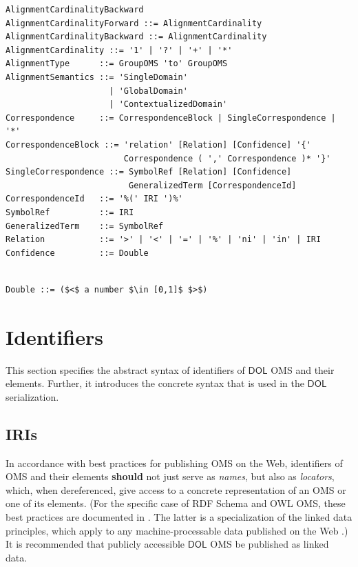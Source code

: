 \documentclass[10pt,fleqn,final]{scrreprt}
\makeatletter
\newcommand*\CommentAuthor{}
\renewcommand*\CommentAuthor{#1}}
\newcommand*\CommentDate{}
\renewcommand*\CommentDate{#1}}
\newcommand*\CommentId{}
\renewcommand*\CommentId{#1}}
\newcommand*\CommentType{}
\renewcommand*\CommentType{#1}}
\newcommand*{\SetCommentColorByType}[1]{%
\edef\localType{{#1}}%
\expandafter\ifstrequal\localType{q-aut}{\colorlet{CommentColor}{red}}{%
\expandafter\ifstrequal\localType{q-all}{\colorlet{CommentColor}{orange}}{%
\expandafter\ifstrequal\localType{todo}{\colorlet{CommentColor}{orange}}{%
\expandafter\ifstrequal\localType{fyi}{\colorlet{CommentColor}{lightgray}}{%
\colorlet{CommentColor}{yellow}}}}}}
\newcommand*{\SetCommentPrefixByType}[1]{%
\edef\localType{{#1}}%
\expandafter\@ifmtarg\localType{%
\edef\CommentPrefix{}%
}{%
\caseupper[q]{#1}%
\edef\CommentPrefix{\thestring: }%
}}
\newcommand*{\initComment}[1]{%
\setkeys{Comment}{#1}%
\SetCommentColorByType{\CommentType}%
\relax%
\SetCommentPrefixByType{\CommentType}%
\relax%
}
\newcommand*{\todonote}[2][]{%
\initComment{#1}%
\pdfcomment[author=\CommentAuthor,color=CommentColor,date=\CommentDate,id=\CommentId]{%
\CommentPrefix
#2}}
\renewcommand*{\todonote}[2][]{%
\initComment{#1}%
\ednote{\CommentPrefix #2}}
\newcommand*{\CLnote}[2][author=Christoph Lange]{%
\todonote[author=Christoph Lange,#1]{#2} 
}
\newcommand*{\should}{\textbf{should}\xspace}
\newcommand*{\DOL}{\ensuremath{\mathsf{DOL}}\xspace}
\newcommand{\sclause}[1]{\section{#1}}
\newcommand{\ssclause}[1]{\subsection{#1}}
\newenvironment{definitions}[0]{\medskip }{}
\makeatother
\begin{document}
\begin{definitions}
\begin{lstlisting}[language=ebnf,mathescape]
                             AlignmentCardinalityBackward
AlignmentCardinalityForward ::= AlignmentCardinality
AlignmentCardinalityBackward ::= AlignmentCardinality
AlignmentCardinality ::= '1' | '?' | '+' | '*'
AlignmentType      ::= GroupOMS 'to' GroupOMS
AlignmentSemantics ::= 'SingleDomain'
                     | 'GlobalDomain'
                     | 'ContextualizedDomain'
Correspondence     ::= CorrespondenceBlock | SingleCorrespondence | '*'
CorrespondenceBlock ::= 'relation' [Relation] [Confidence] '{'
                        Correspondence ( ',' Correspondence )* '}'
SingleCorrespondence ::= SymbolRef [Relation] [Confidence]
                         GeneralizedTerm [CorrespondenceId]
CorrespondenceId   ::= '%(' IRI ')%'
SymbolRef          ::= IRI
GeneralizedTerm    ::= SymbolRef
Relation           ::= '>' | '<' | '=' | '%' | 'ni' | 'in' | IRI
Confidence         ::= Double
\end{lstlisting}

\begin{lstlisting}[language=ebnf,escapeinside={()}]

Double ::= ($<$ a number $\in [0,1]$ $>$) 
\end{lstlisting}






\sclause{Identifiers}\label{c:identifiers}
This section specifies the abstract syntax of identifiers of \DOL OMS and their elements. Further, 
it introduces the concrete syntax that is used in the \DOL serialization. 

\ssclause{IRIs}\label{c:iris}

In accordance with best practices for publishing OMS on the Web, identifiers of OMS and their 
elements \should not just serve as \emph{names}, but also as \emph{locators}, which, when 
dereferenced, give access to a concrete representation of an OMS or one of its elements.  (For the 
specific case of RDF Schema and OWL OMS, these best practices are documented in 
\cite{W3C:NOTE-swbp-vocab-pub-20080828}.  The latter is a specialization of the linked data 
principles, which apply to any machine-processable data published on the Web 
\cite{BernersLee:LinkedData2006}.)  It is recommended that publicly accessible \DOL OMS be published 
as linked data.


\end{definitions}
\end{document}
